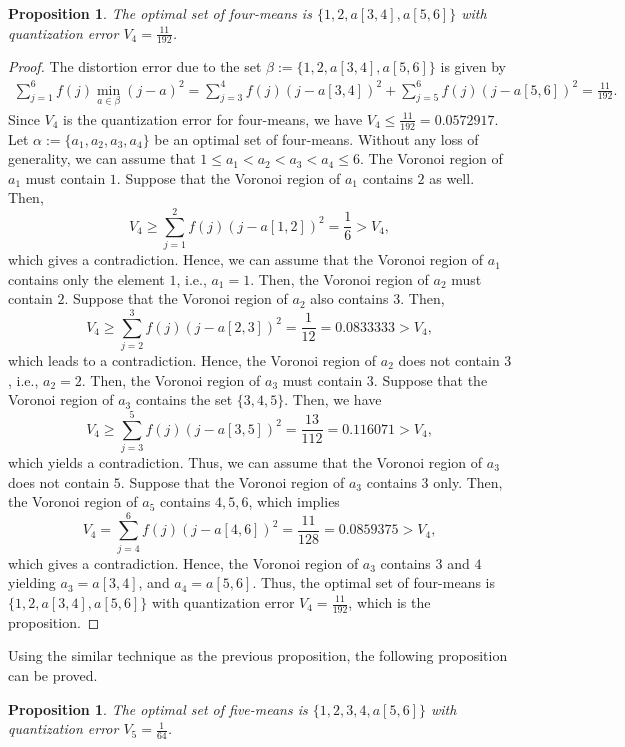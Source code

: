 \documentclass[12pt, reqno]{amsart}
\theoremstyle{plain}
\newtheorem{prop}[subsection]{Proposition}
\theoremstyle{definition}
\newcommand{\set}[1]{\{#1\}}%
\newcommand{\ga}{\alpha}
\newcommand{\gb}{\beta}
\begin{document}
\begin{prop} \label{prop13}
The optimal set of four-means is  $\set{1, 2, a[3,4], a[5,6]}$ with quantization error $V_4=\frac{11}{192}$.
\end{prop}
\begin{proof}
The distortion error due to the set $\gb:=\set{1, 2, a[3,4], a[5,6]}$ is given by
\begin{align*} \sum_{j=1}^6 f(j)\min_{a\in \gb} (j-a)^2=\sum _{j=3}^4f(j)(j-a[3,4])^2+\sum _{j=5}^6f(j)(j-a[5,6])^2 =\frac{11}{192}.
\end{align*}
Since $V_4$ is the quantization error for four-means, we have $V_4\leq\frac{11}{192}=0.0572917$.
Let $\ga:=\set{a_1, a_2, a_3, a_4}$ be an optimal set of four-means. Without any loss of generality, we can assume that $1\leq a_1<a_2<a_3<a_4\leq 6$. The Voronoi region of $a_1$ must contain $1$. Suppose that the Voronoi region of $a_1$ contains $2$ as well. Then,
\[V_4\geq \sum _{j=1}^2f(j)(j-a[1,2])^2=\frac 1 6>V_4,\]
which gives a contradiction. Hence, we can assume that the Voronoi region of $a_1$ contains only the element $1$, i.e., $a_1=1$. Then, the Voronoi region of $a_2$ must contain
$2$. Suppose that the Voronoi region of $a_2$ also contains $3$. Then,
\[V_4\geq \sum _{j=2}^3f(j)(j-a[2,3])^2=\frac 1{12}=0.0833333>V_4,\]
which leads to a contradiction. Hence, the Voronoi region of $a_2$ does not contain $3$, i.e., $a_2=2$. Then, the Voronoi region of $a_3$ must contain $3$. Suppose that the Voronoi region of $a_3$ contains the set $\set{3,4,5}$. Then, we have
\[V_4\geq \sum _{j=3}^5f(j)(j-a[3,5])^2=\frac{13}{112}=0.116071>V_4,\]
which yields a contradiction. Thus, we can assume that the Voronoi region of $a_3$ does not contain $5$. Suppose that the Voronoi region of $a_3$ contains $3$ only. Then, the Voronoi region of $a_5$ contains $4, 5, 6$, which implies
\[V_4=\sum_{j=4}^6 f(j)(j-a[4, 6])^2 =\frac{11}{128}=0.0859375>V_4,\]
which gives a contradiction. Hence, the Voronoi region of $a_3$ contains $3$ and $4$ yielding $a_3=a[3, 4]$, and $a_4=a[5,6]$. Thus, the optimal set of four-means is  $\set{1, 2, a[3,4], a[5,6]}$ with quantization error $V_4=\frac{11}{192}$,  which is the proposition.
\end{proof}

Using the similar technique as the previous proposition, the following proposition can be proved.
\begin{prop} \label{prop14}
The optimal set of five-means is  $\set{1, 2,3,4, a[5,6]}$ with quantization error $V_5=\frac{1}{64}$.
\end{prop}
\end{document}
